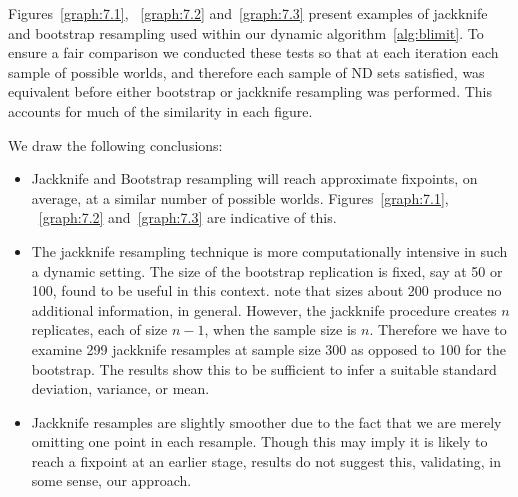 Figures~\ref{graph:7.1}, ~\ref{graph:7.2} and~\ref{graph:7.3} present
examples of jackknife and bootstrap resampling used within our dynamic
algorithm~\ref{alg:blimit}. To ensure a fair comparison we conducted
these tests so that at each iteration each sample of possible worlds,
and therefore each sample of ND sets satisfied, was equivalent before
either bootstrap or jackknife resampling was performed. This accounts
for much of the similarity in each figure.

We draw the following conclusions:
\begin{itemize}
\item Jackknife and Bootstrap resampling will reach approximate
fixpoints, on average, at a similar number of possible
worlds. Figures~\ref{graph:7.1}, ~\ref{graph:7.2} and~\ref{graph:7.3}
are indicative of this. 
\item The jackknife resampling technique is more computationally
intensive in such a dynamic setting. The size of the bootstrap
replication is fixed, say at 50 or 100, found to be useful in this
context. \cite{et86,et93} note that sizes about 200 produce no
additional information, in general. However, the jackknife procedure
creates $n$ replicates, each of size $n-1$, when the sample size is
$n$. Therefore we have to examine 299 jackknife resamples at sample
size 300 as opposed to 100 for the bootstrap. The results show this to
be sufficient to infer a suitable standard deviation, variance, or
mean.
\item Jackknife resamples are slightly smoother due to the fact that
we are merely omitting one point in each resample. Though this may
imply it is likely to reach a fixpoint at an earlier stage, results do
not suggest this, validating, in some sense, our approach.
\end{itemize}



